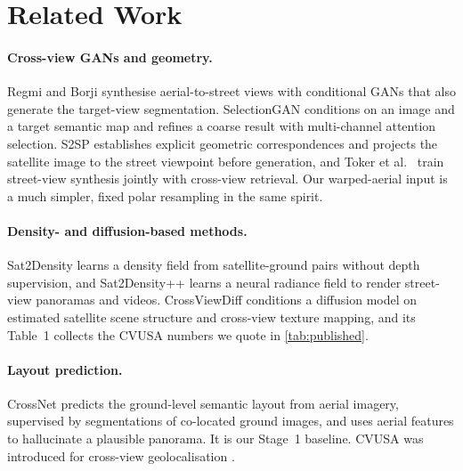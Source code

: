 \documentclass[11pt]{article}
\begin{document}
\section{Related Work}
\label{sec:related}

\paragraph{Cross-view GANs and geometry.} Regmi and Borji \cite{regmi2018crossview} synthesise
aerial-to-street views with conditional GANs that also generate the target-view segmentation. SelectionGAN
\cite{tang2019selectiongan} conditions on an image and a target semantic map and refines a coarse result with
multi-channel attention selection. S2SP \cite{shi2022s2sp} establishes explicit geometric correspondences and
projects the satellite image to the street viewpoint before generation, and Toker et al.\ \cite{toker2021cdte}
train street-view synthesis jointly with cross-view retrieval. Our warped-aerial input is a much simpler,
fixed polar resampling in the same spirit.

\paragraph{Density- and diffusion-based methods.} Sat2Density \cite{qian2023sat2density} learns a density
field from satellite-ground pairs without depth supervision, and Sat2Density++ \cite{qian2025sat2density}
learns a neural radiance field to render street-view panoramas and videos. CrossViewDiff
\cite{li2024crossviewdiff} conditions a diffusion model on estimated satellite scene structure and
cross-view texture mapping, and its Table~1 collects the CVUSA numbers we quote in \cref{tab:published}.

\paragraph{Layout prediction.} CrossNet \cite{zhai2017crossnet} predicts the ground-level semantic layout from
aerial imagery, supervised by segmentations of co-located ground images, and uses aerial features to
hallucinate a plausible panorama. It is our Stage~1 baseline. CVUSA was introduced for cross-view
geolocalisation \cite{workman2015cvusa}.
\end{document}
